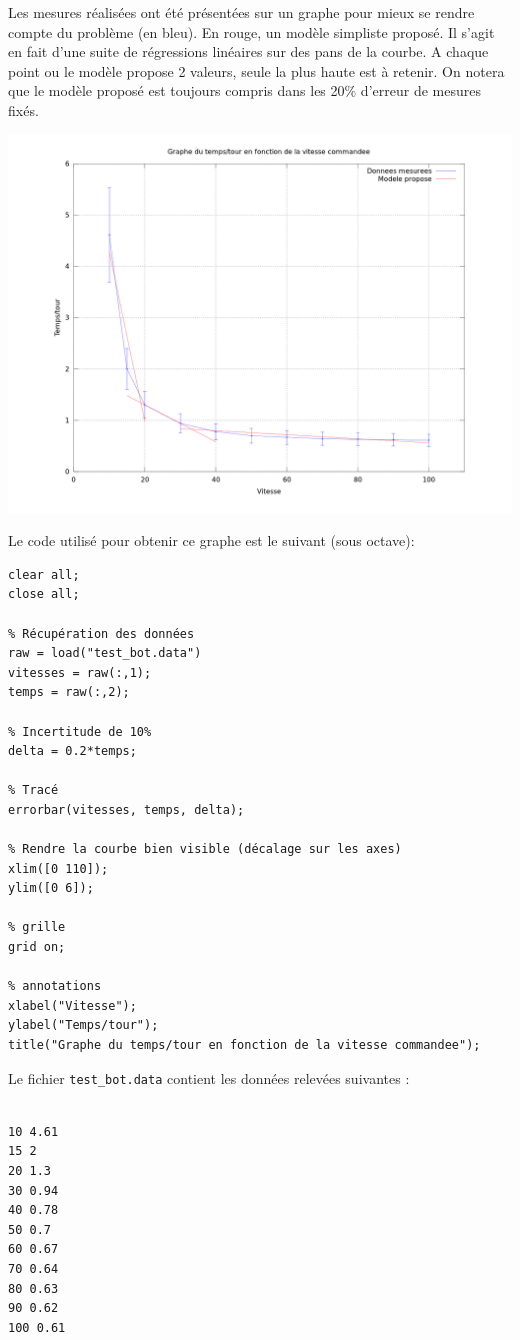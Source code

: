 \documentclass[a4paper]{report}
\begin{document}
Les mesures réalisées ont été présentées sur un graphe pour mieux se rendre compte du problème (en bleu).
En rouge, un modèle simpliste proposé.
Il s'agit en fait d'une suite de régressions linéaires sur des pans de la courbe.
A chaque point ou le modèle propose 2 valeurs, seule la plus haute est à retenir.
On notera que le modèle proposé est toujours compris dans les 20\% d'erreur de mesures fixés.
\begin{center}
\includegraphics[width=17cm]{annexes/roues/fivebot.png}
\end{center}

Le code utilisé pour obtenir ce graphe est le suivant (sous octave):

\begin{verbatim}
clear all;
close all;

% Récupération des données
raw = load("test_bot.data")
vitesses = raw(:,1);
temps = raw(:,2);

% Incertitude de 10%
delta = 0.2*temps;

% Tracé
errorbar(vitesses, temps, delta);

% Rendre la courbe bien visible (décalage sur les axes)
xlim([0 110]);
ylim([0 6]);

% grille
grid on;

% annotations
xlabel("Vitesse");
ylabel("Temps/tour");
title("Graphe du temps/tour en fonction de la vitesse commandee");
\end{verbatim}

Le fichier \texttt{test\_bot.data} contient les données relevées suivantes :
%
\begin{verbatim}

10 4.61
15 2
20 1.3
30 0.94
40 0.78
50 0.7
60 0.67
70 0.64
80 0.63
90 0.62
100 0.61

\end{verbatim}
\end{document}
